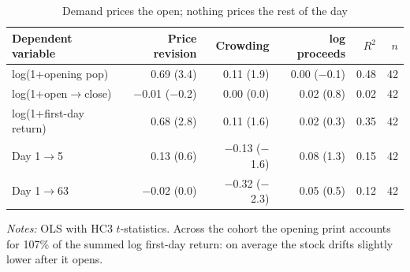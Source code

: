\begin{table}[!htbp]\centering\footnotesize
\caption{Demand prices the open; nothing prices the rest of the day}\label{tab:s3}

\begin{threeparttable}
\begin{tabular}{lrrrrr}
\toprule
Dependent variable & Price revision & Crowding & log proceeds & $R^2$ & $n$ \\
\midrule
log(1+opening pop) & 0.69 (3.4) & 0.11 (1.9) & 0.00 ($-$0.1) & 0.48 & 42 \\
log(1+open$\to$close) & $-$0.01 ($-$0.2) & 0.00 (0.0) & 0.02 (0.8) & 0.02 & 42 \\
log(1+first-day return) & 0.68 (2.8) & 0.11 (1.6) & 0.02 (0.3) & 0.35 & 42 \\
Day 1$\to$5 & 0.13 (0.6) & $-$0.13 ($-$1.6) & 0.08 (1.3) & 0.15 & 42 \\
Day 1$\to$63 & $-$0.02 (0.0) & $-$0.32 ($-$2.3) & 0.05 (0.5) & 0.12 & 42 \\
\bottomrule
\end{tabular}
\begin{tablenotes}[flushleft]\footnotesize
\item \textit{Notes:} OLS with HC3 $t$-statistics. Across the cohort the opening print accounts for 107\% of the summed log first-day return: on average the stock drifts slightly lower after it opens.
\end{tablenotes}
\end{threeparttable}

\end{table}
